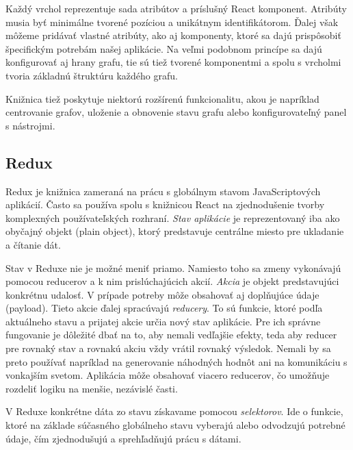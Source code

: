 Každý vrchol reprezentuje sada atribútov a príslušný React komponent. Atribúty musia byť minimálne tvorené pozíciou a unikátnym identifikátorom. Ďalej však môžeme pridávať vlastné atribúty, ako aj komponenty, ktoré sa dajú prispôsobiť špecifickým potrebám našej aplikácie. Na veľmi podobnom princípe sa dajú konfigurovať aj hrany grafu, tie sú tiež tvorené komponentmi a spolu s vrcholmi tvoria základnú štruktúru každého grafu.

Knižnica tiež poskytuje niektorú rozšírenú funkcionalitu, akou je napríklad centrovanie grafov, uloženie a obnovenie stavu grafu alebo
konfigurovateľný panel s nástrojmi.

\subsection{Redux}
Redux \cite{redux} je knižnica zameraná na prácu s globálnym stavom JavaScriptových aplikácií. Často sa používa spolu s knižnicou React na zjednodušenie tvorby komplexných používateľských rozhraní. \emph{Stav aplikácie} je reprezentovaný iba ako obyčajný objekt (plain object), ktorý predstavuje centrálne miesto pre ukladanie a čítanie dát.


Stav v Reduxe nie je možné meniť priamo. Namiesto toho sa zmeny vykonávajú pomocou reducerov a k nim prislúchajúcich akcií. \emph{Akcia} je objekt predstavujúci konkrétnu udalosť. V prípade potreby môže obsahovať aj doplňujúce údaje (payload). Tieto akcie ďalej spracúvajú \emph{reducery}. To sú funkcie, ktoré podľa aktuálneho stavu a prijatej akcie určia nový stav aplikácie. Pre ich správne fungovanie je dôležité dbať na to, aby nemali vedľajšie efekty, teda aby reducer pre rovnaký stav a rovnakú akciu vždy vrátil rovnaký výsledok. Nemali by sa preto používať napríklad na generovanie náhodných hodnôt ani na komunikáciu s vonkajším svetom. Aplikácia môže obsahovať viacero reducerov, čo umožňuje rozdeliť logiku na menšie, nezávislé časti.

V Reduxe konkrétne dáta zo stavu získavame pomocou \emph{selektorov}. Ide o funkcie, ktoré na základe súčasného globálneho stavu vyberajú alebo odvodzujú potrebné údaje, čím zjednodušujú a sprehľadňujú prácu s dátami.

